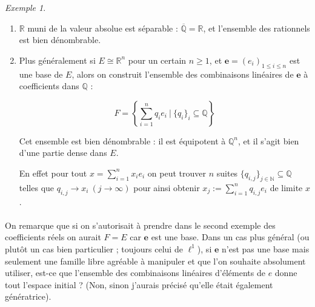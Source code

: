 \documentclass[]{article}
\theoremstyle{remark}
\newtheorem{myexmpl}{Exemple}
\theoremstyle{definition}
\newcommand{\DS}{\displaystyle}
\begin{document}
	\begin{myexmpl}
		\leavevmode
		\begin{enumerate}
			\item $\mathbb{R}$ muni de la valeur absolue est séparable : $\overline{\mathbb{Q}} = \mathbb{R}$, et l'ensemble des rationnels est bien dénombrable.
			
			\item Plus généralement si $E \cong \mathbb{R}^n$ pour un certain $n \geqslant 1$, et $\mathbf{e}=(e_i)_{1 \leqslant i \leqslant n}$ est une base de $E$, alors on construit l'ensemble des combinaisons linéaires de $\mathbf{e}$ à coefficients dans $\mathbb{Q}$ :
			
			$$F = \left\{\DS \sum_{i = 1}^{n} q_i e_i ~ | ~ \{q_i\}_i \subseteq \mathbb{Q} \right\}$$
			
			Cet ensemble est bien dénombrable : il est équipotent à $\mathbb{Q}^n$, et il s'agit bien d'une partie dense dans $E$.
			
			En effet pour tout $\DS x = \sum_{i = 1}^n x_i e_i$ on peut trouver $n$ suites $\{q_{i, j}\}_{j \in \mathbb{N}} \subseteq \mathbb{Q}$ telles que $q_{i, j} \to x_i ~ (j \to \infty)$ pour ainsi obtenir $\DS x_j := \sum_{i = 1}^{n} q_{i, j} e_i$ de limite $x$.
		\end{enumerate}
	\end{myexmpl}
	
	\paragraph*{}
	
	
	On remarque que si on s'autorisait à prendre dans le second exemple des coefficients réels on aurait $F = E$ car $\mathbf{e}$ est une base. Dans un cas plus général (ou plutôt un cas bien particulier ; toujours celui de $\ell^1$), si $\mathbf{e}$ n'est pas une base mais seulement une famille libre agréable à manipuler et que l'on souhaite absolument utiliser, est-ce que l'ensemble des combinaisons linéaires d'éléments de $e$ donne tout l'espace initial ? (Non, sinon j'aurais précisé qu'elle était également génératrice).
		
\end{document}
